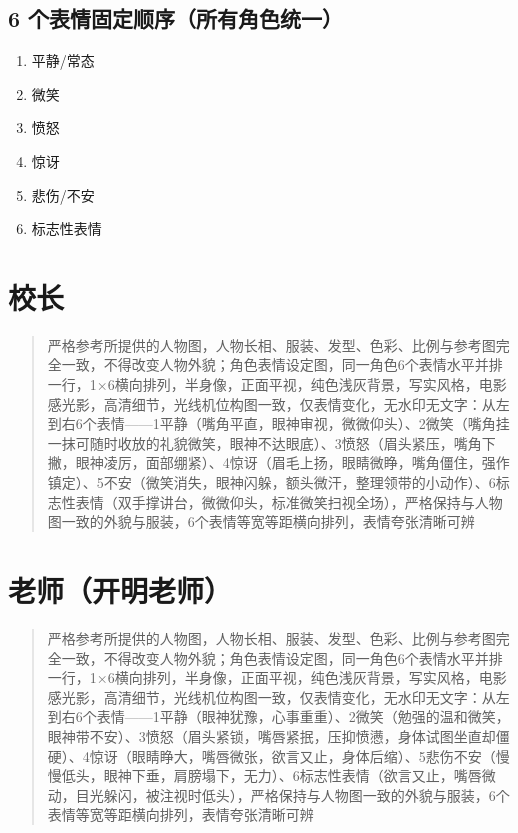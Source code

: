 \documentclass[11pt, a4paper]{article}
\begin{document}
	\subsection*{6 个表情固定顺序（所有角色统一）}
	\begin{enumerate}[leftmargin=2em, itemsep=0.2em]
		\item 平静/常态
		\item 微笑
		\item 愤怒
		\item 惊讶
		\item 悲伤/不安
		\item 标志性表情
	\end{enumerate}
	
	\newpage
	
	\section{校长}
	
	\begin{quote}
		\small
		严格参考所提供的人物图，人物长相、服装、发型、色彩、比例与参考图完全一致，不得改变人物外貌；角色表情设定图，同一角色6个表情水平并排一行，1×6横向排列，半身像，正面平视，纯色浅灰背景，写实风格，电影感光影，高清细节，光线机位构图一致，仅表情变化，无水印无文字：从左到右6个表情——1平静（嘴角平直，眼神审视，微微仰头）、2微笑（嘴角挂一抹可随时收放的礼貌微笑，眼神不达眼底）、3愤怒（眉头紧压，嘴角下撇，眼神凌厉，面部绷紧）、4惊讶（眉毛上扬，眼睛微睁，嘴角僵住，强作镇定）、5不安（微笑消失，眼神闪躲，额头微汗，整理领带的小动作）、6标志性表情（双手撑讲台，微微仰头，标准微笑扫视全场），严格保持与人物图一致的外貌与服装，6个表情等宽等距横向排列，表情夸张清晰可辨
	\end{quote}
	
	\section{老师（开明老师）}
	
	\begin{quote}
		\small
		严格参考所提供的人物图，人物长相、服装、发型、色彩、比例与参考图完全一致，不得改变人物外貌；角色表情设定图，同一角色6个表情水平并排一行，1×6横向排列，半身像，正面平视，纯色浅灰背景，写实风格，电影感光影，高清细节，光线机位构图一致，仅表情变化，无水印无文字：从左到右6个表情——1平静（眼神犹豫，心事重重）、2微笑（勉强的温和微笑，眼神带不安）、3愤怒（眉头紧锁，嘴唇紧抿，压抑愤懑，身体试图坐直却僵硬）、4惊讶（眼睛睁大，嘴唇微张，欲言又止，身体后缩）、5悲伤不安（慢慢低头，眼神下垂，肩膀塌下，无力）、6标志性表情（欲言又止，嘴唇微动，目光躲闪，被注视时低头），严格保持与人物图一致的外貌与服装，6个表情等宽等距横向排列，表情夸张清晰可辨
	\end{quote}
	
\end{document}
